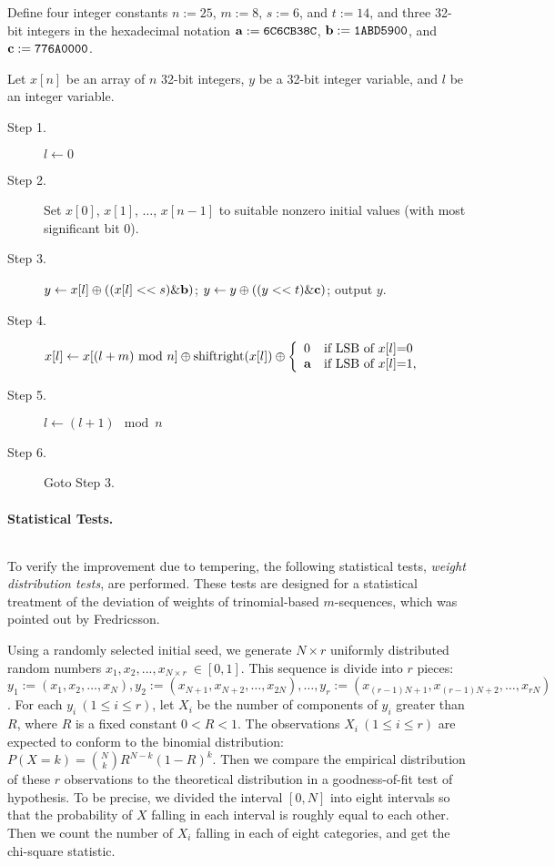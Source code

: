 Define four integer constants $n:=25$, $m:=8$, $s:=6$, and $t:=14$,
and three 32-bit integers in the hexadecimal notation
${\bf a} := {\tt 6C6CB38C}$,
${\bf b} := {\tt 1ABD5900}$, and
${\bf c} := {\tt 776A0000}$.

Let $x[n]$ be an array of $n$ 
32-bit integers,
$y$ be a 32-bit integer variable,
and $l$ be an integer variable.
\begin{description}
\item[Step 1.] $l\leftarrow 0$
\item[Step 2.] Set $x[0]$, $x[1]$, $\ldots$, $x[n-1]$ to 
suitable nonzero initial values (with most significant bit 0).
\item[Step 3.] 
$y \leftarrow x[l] \oplus ((x[l]<< s) \& {\bf b})$;
$y \leftarrow y \oplus ((y << t) \& {\bf c})$;
output $y$.
\item[Step 4.]
$x[l]\leftarrow x[(l+m) {\mbox{ mod }}  n] \oplus \mbox{shiftright}(x[l])
 \oplus \left\{ \begin{array}{ll}
		0   & \mbox{if LSB of $x[l]$=0} \\
		{\bf a} & \mbox{if LSB of $x[l]$=1,}
	       \end{array}
	\right.
$
\item[Step 5.] $l\leftarrow (l+1) \mod  n$
\item[Step 6.] Goto Step 3.
\end{description}

\paragraph{Statistical Tests.}
$ $


To verify the improvement due to tempering, 
the following statistical tests, 
{\em weight distribution tests}\cite{matsumoto}, 
are performed.
These tests are designed for a statistical treatment
of the deviation of weights
of trinomial-based $m$-sequences,
which was pointed out by Fredricsson\cite{fredricsson}.

Using a randomly selected initial seed, 
we generate $ N \times r $ uniformly 
distributed random numbers 
$x_1,x_2,...,x_{N \times r} \ \in [0,1]$.
This sequence is divide into $r$ pieces:
$
y_1:=(x_        1 ,x_        2 ,\ldots,x_  N ),
y_2:=(x_{     N+1},x_{     N+2},\ldots,x_{2N}),\ldots,
y_r:=(x_{(r-1)N+1},x_{(r-1)N+2},\ldots,x_{rN})
$.
For each $y_i \ (1 \leq i \leq r)$, 
let $X_i$ be the number of 
components of $y_i$ 
greater than $R$, where $R$ is a fixed constant 
$0<R<1$. 
The observations
$X_i \ (1 \leq i \leq r)$ are 
expected to conform to the binomial distribution: 
$P(X=k)= {N \choose k} R^{N-k} (1-R)^k$.
Then we compare the empirical distribution of
these $r$ observations
to the theoretical distribution
in a goodness-of-fit test of hypothesis.
To be precise,
we divided the interval $[0,N]$ 
into eight intervals so that
the probability
of
$X$ falling in each interval is roughly equal to
each other.
Then we count the number of $X_i$
falling in each of eight categories,
and get the chi-square statistic\cite{knuth}.

